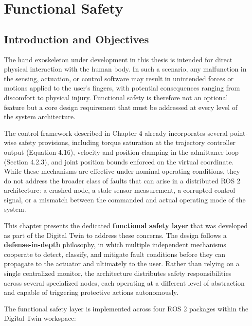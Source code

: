 \chapter{Functional Safety}
\section{Introduction and Objectives}
The hand exoskeleton under development in this thesis is intended for direct physical interaction with the human body. In such a scenario, any malfunction in the sensing, actuation, or control software may result in unintended forces or motions applied to the user's fingers, with potential consequences ranging from discomfort to physical injury. Functional safety is therefore not an optional feature but a core design requirement that must be addressed at every level of the system architecture.
 
The control framework described in Chapter 4 already incorporates several point-wise safety provisions, including torque saturation at the trajectory controller output (Equation 4.16), velocity and position clamping in the admittance loop (Section 4.2.3), and joint position bounds enforced on the virtual coordinate. While these mechanisms are effective under nominal operating conditions, they do not address the broader class of faults that can arise in a distributed ROS 2 architecture: a crashed node, a stale sensor measurement, a corrupted control signal, or a mismatch between the commanded and actual operating mode of the system.

This chapter presents the dedicated \textbf{functional safety layer} that was developed as part of the Digital Twin to address these concerns. The design follows a \textbf{defense-in-depth} philosophy, in which multiple independent mechanisms cooperate to detect, classify, and mitigate fault conditions before they can propagate to the actuator and ultimately to the user. Rather than relying on a single centralized monitor, the architecture distributes safety responsibilities across several specialized nodes, each operating at a different level of abstraction and capable of triggering protective actions autonomously.

The functional safety layer is implemented across four ROS 2 packages within the Digital Twin workspace:

